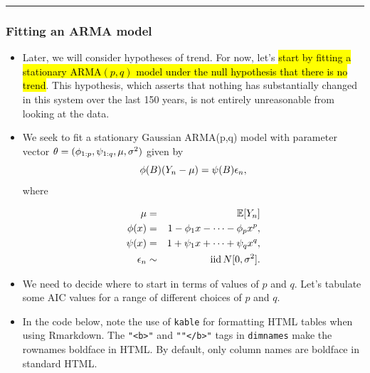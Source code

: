 \documentclass[]{article}
\begin{document}
\begin{center}\rule{0.5\linewidth}{\linethickness}\end{center}

\subsubsection{Fitting an ARMA model}\label{fitting-an-arma-model}

\begin{itemize}
\item
  Later, we will consider hypotheses of trend. For now, let's \hl{start by
  fitting a stationary ARMA$(p,q)$ model under the null hypothesis
  that there is no trend}. This hypothesis, which asserts that nothing
  has substantially changed in this system over the last 150 years, is
  not entirely unreasonable from looking at the data.
\item
  We seek to fit a stationary Gaussian ARMA(p,q) model with parameter
  vector \(\theta=(\phi_{1:p},\psi_{1:q},\mu,\sigma^2)\) given by
  \[ \phi(B)(Y_n-\mu) = \psi(B) \epsilon_n,\] where

  \begin{eqnarray}
  \mu &=& \mathbb{E}[Y_n]
  \\
  \phi(x)&=&1-\phi_1 x-\dots -\phi_px^p,
  \\ 
  \psi(x)&=&1+\psi_1 x+\dots +\psi_qx^q, 
  \\
  \epsilon_n&\sim&\mathrm{ iid }\, N[0,\sigma^2].
  \end{eqnarray}
\item
  We need to decide where to start in terms of values of \(p\) and
  \(q\). Let's tabulate some AIC values for a range of different choices
  of \(p\) and \(q\).
\item
  In the code below, note the use of \texttt{kable} for formatting HTML
  tables when using Rmarkdown. The \texttt{"\textless{}b\textgreater{}"}
  and \texttt{""\textless{}/b\textgreater{}"} tags in \texttt{dimnames}
  make the rownames boldface in HTML. By default, only column names are
  boldface in standard HTML.
\end{itemize}
\end{document}
